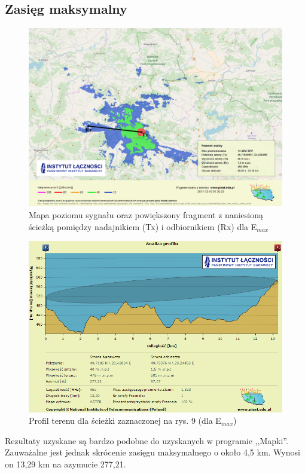\documentclass[12pt, a4paper, oneside]{article}
\begin{document}
\subsection{Zasięg maksymalny}
\begin{figure}[h!]
\centering
\includegraphics[scale=0.45]{pics/piast/f5.png}
\caption{Mapa poziomu sygnału oraz powiększony fragment z naniesioną ścieżką pomiędzy nadajnikiem (Tx) i odbiornikiem (Rx) dla E$_{max}$}
\end{figure}
\begin{figure}[h!]
\centering
\includegraphics[scale=0.45]{pics/piast/f3.png}
\caption{Profil terenu dla ścieżki zaznaczonej na rys. 9 (dla E$_{max}$)}
\end{figure}
Rezultaty uzyskane są bardzo podobne do uzyskanych w programie ,,Mapki''. Zauważalne jest jednak skrócenie zasięgu maksymalnego o około 4,5 km. Wynosi on 13,29 km na azymucie 277,21\textdegree.
\clearpage
\end{document}

